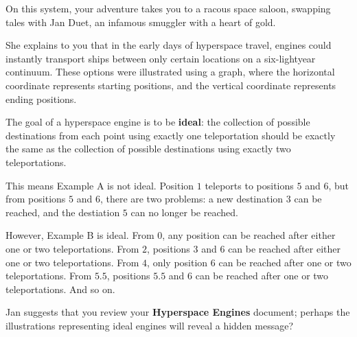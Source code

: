 On this system, your adventure takes you to a racous space saloon, swapping tales
with Jan Duet, an infamous smuggler with a heart of gold.

She explains to you that in the early days of hyperspace travel, engines could
instantly transport ships between only certain locations on a six-lightyear continuum.
These options were illustrated using a graph, where the horizontal coordinate
represents starting positions, and the vertical coordinate represents ending positions.


The goal of a hyperspace engine is to be \textbf{ideal}: the collection of possible
destinations from each point using exactly one teleportation should be exactly the 
same as the collection of possible destinations using exactly two teleportations.

This means Example A is not ideal. Position \(1\) teleports to
positions \(5\) and \(6\), but from positions \(5\) and \(6\), there are two
problems: a new destination \(3\) can be reached, and the destiation \(5\) can
no longer be reached.

However, Example B is ideal. From \(0\), any position can be reached after either
one or two teleportations. From \(2\), positions \(3\) and \(6\) can be reached
after either one or two teleportations. From \(4\), only position \(6\) can be reached
after one or two teleportations. From \(5.5\), positions \(5.5\) and \(6\) can be
reached after one or two teleportations. And so on.

Jan suggests that you review your \textbf{Hyperspace Engines} document;
perhaps the illustrations representing ideal engines will reveal a hidden message?

